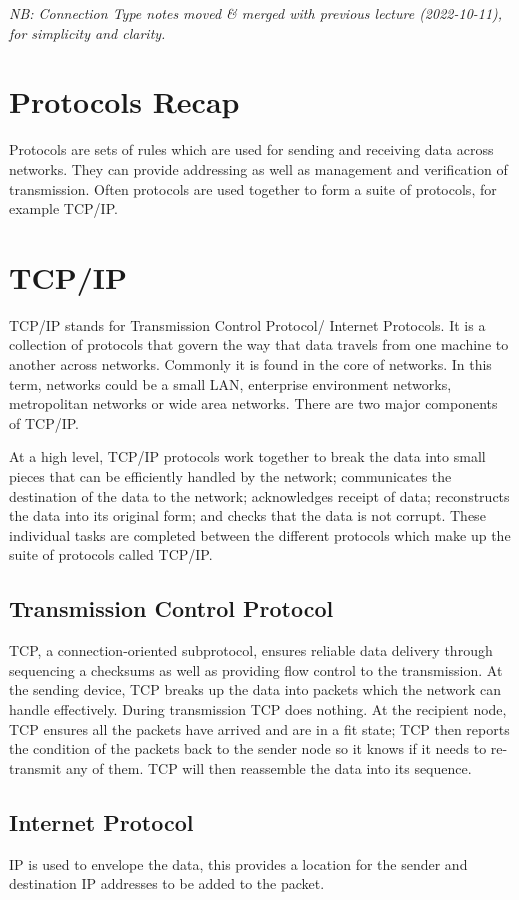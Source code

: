 \textit{NB: Connection Type notes moved \& merged with previous lecture (2022-10-11), for simplicity and clarity.}
\section*{Protocols Recap}
Protocols are sets of rules which are used for sending and receiving data across networks. They can provide addressing as well as management and verification of transmission. Often protocols are used together to form a suite of protocols, for example TCP/IP.

\section*{TCP/IP}
TCP/IP stands for Transmission Control Protocol/ Internet Protocols. It is a collection of protocols that govern the way that data travels from one machine to another across networks. Commonly it is found in the core of networks. In this term, networks could be a small LAN, enterprise environment networks, metropolitan networks or wide area networks. There are two major components of TCP/IP.

At a high level, TCP/IP protocols work together to break the data into small pieces that can be efficiently handled by the network; communicates the destination of the data to the network; acknowledges receipt of data; reconstructs the data into its original form; and checks that the data is not corrupt. These individual tasks are completed between the different protocols which make up the suite of protocols called TCP/IP.
\subsection*{Transmission Control Protocol}
 TCP, a connection-oriented subprotocol, ensures reliable data delivery through sequencing a checksums as well as providing flow control to the transmission. At the sending device, TCP breaks up the data into packets which the network can handle effectively. During transmission TCP does nothing. At the recipient node, TCP ensures all the packets have arrived and are in a fit state; TCP then reports the condition of the packets back to the sender node so it knows if it needs to re-transmit any of them. TCP will then reassemble the data into its sequence.
\subsection*{Internet Protocol}
IP is used to envelope the data, this provides a location for the sender and destination IP addresses to be added to the packet.


